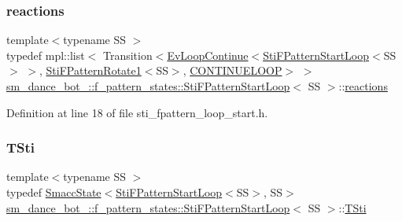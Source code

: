 \subsubsection{\texorpdfstring{reactions}{reactions}}
{\footnotesize\ttfamily template$<$typename SS $>$ \\
typedef mpl\+::list$<$ Transition$<$\hyperlink{structsmacc_1_1default__events_1_1EvLoopContinue}{Ev\+Loop\+Continue}$<$\hyperlink{classsm__dance__bot__2_1_1f__pattern__states_1_1StiFPatternStartLoop}{Sti\+F\+Pattern\+Start\+Loop}$<$SS$>$ $>$, \hyperlink{classsm__dance__bot__2_1_1f__pattern__states_1_1StiFPatternRotate1}{Sti\+F\+Pattern\+Rotate1}$<$SS$>$, \hyperlink{structsmacc_1_1default__transition__tags_1_1CONTINUELOOP}{C\+O\+N\+T\+I\+N\+U\+E\+L\+O\+OP}$>$ $>$ \hyperlink{classsm__dance__bot__2_1_1f__pattern__states_1_1StiFPatternStartLoop}{sm\+\_\+dance\+\_\+bot\+\_\+::f\+\_\+pattern\+\_\+states\+::\+Sti\+F\+Pattern\+Start\+Loop}$<$ SS $>$\+::\hyperlink{classsm__dance__bot__2_1_1f__pattern__states_1_1StiFPatternStartLoop_a93f6fd1001554fdafc79b058c2162c5f}{reactions}}



Definition at line 18 of file sti\+\_\+fpattern\+\_\+loop\+\_\+start.\+h.

\mbox{\label{classsm__dance__bot__2_1_1f__pattern__states_1_1StiFPatternStartLoop_a9356cd8c0458f8b0854939cebf8e1095}} 
\subsubsection{\texorpdfstring{T\+Sti}{TSti}}
{\footnotesize\ttfamily template$<$typename SS $>$ \\
typedef \hyperlink{classSmaccState}{Smacc\+State}$<$\hyperlink{classsm__dance__bot__2_1_1f__pattern__states_1_1StiFPatternStartLoop}{Sti\+F\+Pattern\+Start\+Loop}$<$SS$>$, SS$>$ \hyperlink{classsm__dance__bot__2_1_1f__pattern__states_1_1StiFPatternStartLoop}{sm\+\_\+dance\+\_\+bot\+\_\+::f\+\_\+pattern\+\_\+states\+::\+Sti\+F\+Pattern\+Start\+Loop}$<$ SS $>$\+::\hyperlink{classsm__dance__bot__2_1_1f__pattern__states_1_1StiFPatternStartLoop_a9356cd8c0458f8b0854939cebf8e1095}{T\+Sti}}



